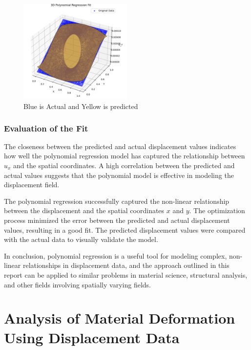 \documentclass[fleqn,10pt]{olplainarticle}
\begin{document}
\begin{figure}[h!]
\centering
\includegraphics[width=0.5\textwidth]{Photo/9.png}
\caption{Blue is Actual and Yellow is predicted}
\end{figure}

\subsubsection{Evaluation of the Fit}
The closeness between the predicted and actual displacement values indicates how well the polynomial regression model has captured the relationship between $u_x$ and the spatial coordinates. A high correlation between the predicted and actual values suggests that the polynomial model is effective in modeling the displacement field.


The polynomial regression successfully captured the non-linear relationship between the displacement and the spatial coordinates $x$ and $y$. The optimization process minimized the error between the predicted and actual displacement values, resulting in a good fit. The predicted displacement values were compared with the actual data to visually validate the model.

In conclusion, polynomial regression is a useful tool for modeling complex, non-linear relationships in displacement data, and the approach outlined in this report can be applied to similar problems in material science, structural analysis, and other fields involving spatially varying fields.


\section{Analysis of Material Deformation Using Displacement Data}
\end{document}
